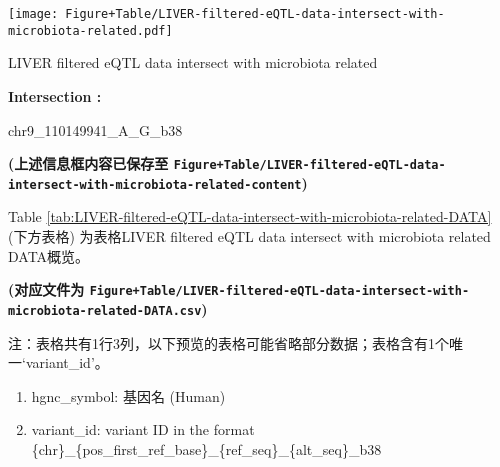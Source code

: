 \documentclass[
]{article}
\providecommand{\tightlist}{%
  \setlength{\itemsep}{0pt}\setlength{\parskip}{0pt}}
\begin{document}
\def\@captype{figure}
\begin{center}
\texttt{[image: Figure+Table/LIVER-filtered-eQTL-data-intersect-with-microbiota-related.pdf]}
\caption{LIVER filtered eQTL data intersect with microbiota related}\label{fig:LIVER-filtered-eQTL-data-intersect-with-microbiota-related}
\end{center}
\begin{center}\begin{tcolorbox}[colback=gray!10, colframe=gray!50, width=0.9\linewidth, arc=1mm, boxrule=0.5pt]
\textbf{
Intersection
:}

\vspace{0.5em}

    chr9\_110149941\_A\_G\_b38

\vspace{2em}
\end{tcolorbox}
\end{center}

\textbf{(上述信息框内容已保存至 \texttt{Figure+Table/LIVER-filtered-eQTL-data-intersect-with-microbiota-related-content})}

Table \ref{tab:LIVER-filtered-eQTL-data-intersect-with-microbiota-related-DATA} (下方表格) 为表格LIVER filtered eQTL data intersect with microbiota related DATA概览。

\textbf{(对应文件为 \texttt{Figure+Table/LIVER-filtered-eQTL-data-intersect-with-microbiota-related-DATA.csv})}

\begin{center}\begin{tcolorbox}[colback=gray!10, colframe=gray!50, width=0.9\linewidth, arc=1mm, boxrule=0.5pt]注：表格共有1行3列，以下预览的表格可能省略部分数据；表格含有1个唯一`variant\_id'。
\end{tcolorbox}
\end{center}
\begin{center}\begin{tcolorbox}[colback=gray!10, colframe=gray!50, width=0.9\linewidth, arc=1mm, boxrule=0.5pt]\begin{enumerate}\tightlist
\item hgnc\_symbol:  基因名 (Human)
\item variant\_id:  variant ID in the format \{chr\}\_\{pos\_first\_ref\_base\}\_\{ref\_seq\}\_\{alt\_seq\}\_b38
\end{enumerate}\end{tcolorbox}
\end{center}
\end{document}
